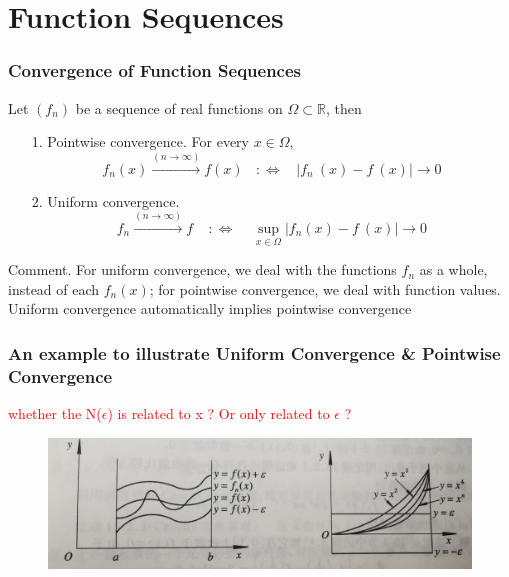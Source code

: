 \documentclass{beamer}
\begin{document}
\section{Function Sequences}
\begin{frame}
    \frametitle{Convergence of Function Sequences}
    Let $(f_n)$ be a sequence of real functions on $\Omega \subset \mathbb{R}$, then \\
    \begin{itemize}
        \item [1.]Pointwise convergence. For every $x \in \Omega,$ $$f_n (x) \xrightarrow{(n\to \infty)} f(x) ~~~~  :\Leftrightarrow ~~~~ |f_n ~(x)-f~(x)|\to 0$$
        \item [2.]Uniform convergence. $$f_n \xrightarrow{(n\to \infty)} f  ~~~~~:\Leftrightarrow ~~~~~  \underset{x \in \Omega}{\sup} ⁡|f_n (x)-f~(x)|\to 0 $$
    \end{itemize}

    Comment. For uniform convergence, we deal with the functions $f_n$ as a whole, instead of each $f_n (x)$;
    for pointwise convergence, we deal with function values. Uniform convergence automatically implies pointwise convergence
\end{frame}

\begin{frame}
    \frametitle{An example to illustrate Uniform Convergence \& Pointwise Convergence}
    \textcolor{red}{whether the N($\epsilon$) is related to x ? Or only related to $\epsilon$ ?}
    \begin{figure}[htbp]
        \centering
        \includegraphics[width=12cm]{illustrate.jpg}
    \end{figure}
\end{frame}
\end{document}

